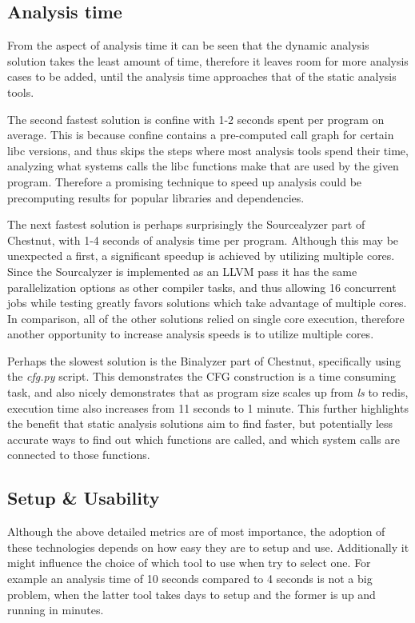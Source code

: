 \subsection {Analysis time}
From the aspect of analysis time it can be seen that the dynamic analysis solution takes the least amount of time, therefore it leaves room for more analysis cases to be added, until the analysis time approaches that of the static analysis tools.

The second fastest solution is confine with 1-2 seconds spent per program on average. This is because confine contains a pre-computed call graph for certain libc versions, and thus skips the steps where most analysis tools spend their time, analyzing what systems calls the libc functions make that are used by the given program. Therefore a promising technique to speed up analysis could be precomputing results for popular libraries and dependencies.

The next fastest solution is perhaps surprisingly the Sourcealyzer part of Chestnut, with 1-4 seconds of analysis time per program. Although this may be unexpected a first, a significant speedup is achieved by utilizing multiple cores. Since the Sourcalyzer is implemented as an LLVM pass it has the same parallelization options as other compiler tasks, and thus allowing 16 concurrent jobs while testing greatly favors solutions which take advantage of multiple cores. In comparison, all of the other solutions relied on single core execution, therefore another opportunity to increase analysis speeds is to utilize multiple cores.

Perhaps the slowest solution is the Binalyzer part of Chestnut, specifically using the \textit{cfg.py} script.
This demonstrates the CFG construction is a time consuming task, and also nicely demonstrates that as program size scales up from \textit{ls} to redis, execution time also increases from 11 seconds to 1 minute. This further highlights the benefit that static analysis solutions aim to find faster, but potentially less accurate ways to find out which functions are called, and which system calls are connected to those functions.

\subsection {Setup \& Usability}
Although the above detailed metrics are of most importance, the adoption of these technologies depends on how easy they are to setup and use. Additionally it might influence the choice of which tool to use when try to select one. For example an analysis time of 10 seconds compared to 4 seconds is not a big problem, when the latter tool takes days to setup and the former is up and running in minutes.

